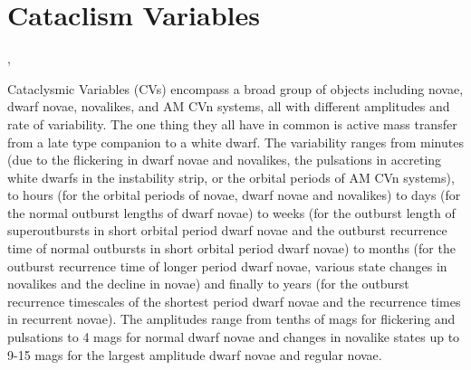 %
%
%
%
%
%
%
%

\section{Cataclism Variables}
\def\secname{CVtransients}\label{sec:\secname} %

,  %

Cataclysmic Variables (CVs) encompass a broad group of objects
including novae, dwarf novae, novalikes, and AM CVn systems, all with different
amplitudes and rate of variability. The one thing they all have in
common is active mass transfer from a late type companion to a
white dwarf. The variability ranges from minutes (due to the flickering in
dwarf novae and novalikes, the pulsations in accreting white dwarfs in
the instability strip, or the orbital periods of AM CVn systems), to
hours (for the orbital periods of novae, dwarf novae and novalikes) to
days (for the normal outburst lengths of dwarf novae) to 
weeks (for the outburst length of superoutbursts in short orbital period
dwarf novae and the outburst recurrence time of normal outbursts in short
orbital period dwarf novae) to months (for the outburst recurrence time of 
longer period dwarf novae, various state changes in novalikes and the decline 
in novae) and finally to years (for the outburst recurrence timescales of the 
shortest period dwarf novae and the recurrence times in recurrent novae). The 
amplitudes range from tenths of mags for flickering and pulsations to 4 mags 
for normal dwarf novae and changes in novalike states up to 9-15 mags for the 
largest amplitude dwarf novae and regular novae.

